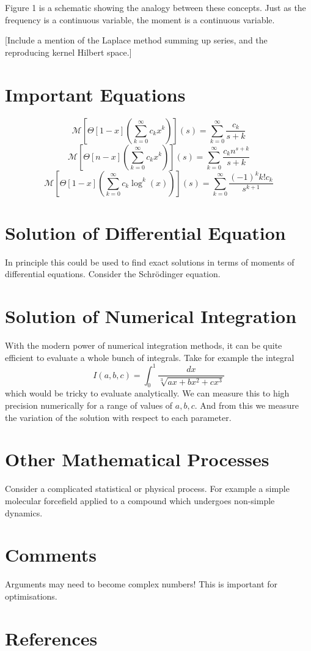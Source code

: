 \documentclass{article}
\begin{document}
Figure 1 is a schematic showing the analogy between these concepts. Just as the frequency is a continuous variable, the moment is a continuous variable. 


[Include a mention of the Laplace method summing up series, and the reproducing kernel Hilbert space.]


{\color{red}
\section{Important Equations}
\begin{equation}
\mathcal{M}\left[\Theta[1-x]\left(\sum_{k=0}^\infty c_k x^k \right)\right](s) = \sum_{k=0}^\infty \frac{c_k}{s+k}
\end{equation}
\begin{equation}
\mathcal{M}\left[\Theta[n-x]\left(\sum_{k=0}^\infty c_k  x^k \right)\right](s) = \sum_{k=0}^\infty \frac{c_k n^{s+k}}{s+k}
\end{equation}
\begin{equation}
\mathcal{M}\left[\Theta[1-x]\left(\sum_{k=0}^\infty c_k \log^k(x) \right)\right](s) = \sum_{k=0}^\infty \frac{(-1)^k k! c_k}{s^{k+1}}
\end{equation}



\section{Solution of Differential Equation}
In principle this could be used to find exact solutions in terms of moments of differential equations. Consider the Schrödinger equation.

\section{Solution of Numerical Integration}
With the modern power of numerical integration methods, it can be quite efficient to evaluate a whole bunch of integrals. Take for example the integral
\begin{equation}
I(a,b,c) = \int_0^1 \frac{dx}{\sqrt[3]{a x + b x^2 + cx^3}}
\end{equation}
which would be tricky to evaluate analytically. We can measure this to high precision numerically for a range of  values of $a,b,c$. And from this we measure the variation of the solution with respect to each parameter.

\section{Other Mathematical Processes}
Consider a complicated statistical or physical process. For example a simple molecular forcefield applied to a compound which undergoes non-simple dynamics.


\section{Comments}
Arguments may need to become complex numbers! This is important for optimisations. 
}


\section{References}

\end{document}
